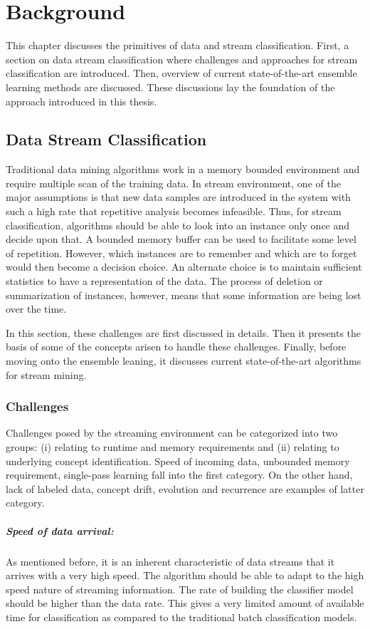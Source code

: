 \chapter{Background}
\label{chp:background}
This chapter discusses the primitives of data and stream classification. First, a section on data stream classification where challenges and approaches for stream classification are introduced. Then, overview of current state-of-the-art ensemble learning methods are discussed. These discussions  lay the foundation of the approach introduced in this thesis.

\section{Data Stream Classification}
Traditional data mining algorithms work in a memory bounded environment and require multiple scan of the training data. In stream environment, one of the major assumptions is that new data samples are introduced in the system with such a high rate that repetitive analysis becomes infeasible. Thus, for stream classification, algorithms should be able to look into an instance only once and decide upon that. A bounded memory buffer can be used to facilitate some level of repetition. However, which instances are to remember and which are to forget would then become a decision choice. An alternate choice is to maintain sufficient statistics to have a representation of the data. The process of deletion or summarization of instances, however, means that some information are being lost over the time.

In this section, these challenges are first discussed in details. Then it presents the basis of some of the concepts arisen to handle these challenges. Finally, before moving onto the ensemble leaning, it discusses current state-of-the-art algorithms for stream mining.

\subsection{Challenges}
Challenges posed by the streaming environment can be categorized into two groups: (i) relating to runtime and memory requirements and (ii) relating to underlying concept identification. Speed of incoming data, unbounded memory requirement, single-pass learning fall into the first category. On the other hand, lack of labeled data, concept drift, evolution and recurrence are examples of latter category.

\paragraph{Speed of data arrival:}
As mentioned before, it is an inherent characteristic of data streams that it arrives with a very high speed. The algorithm should be able to adapt to the high speed nature of streaming information. The rate of building the classifier model should be higher than the data rate. This gives a very limited amount of available time for classification as compared to the traditional batch classification models.

